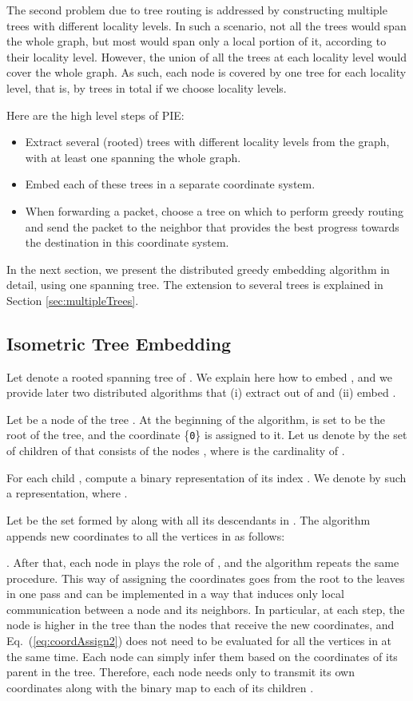 \documentclass[conference]{IEEEtran}
\begin{document}
The second problem due to tree routing is addressed by constructing multiple trees with different locality levels. In such a scenario, not all the trees would span the whole graph, but most would span only a local portion of it, according to their locality level. However, the union of all the trees at each locality level would cover the whole graph. As such, each node is covered by one tree for each locality level, that is, by  trees in total if we choose  locality levels.

Here are the high level steps of PIE:

\begin{itemize}
 \item Extract several (rooted) trees with different locality levels from the graph, with at least one spanning the whole graph.
 \item Embed each of these trees in a separate coordinate system.
 \item When forwarding a packet, choose a tree on which to perform greedy routing and send the packet to the neighbor that provides the best progress towards the destination in this coordinate system.
\end{itemize}

In the next section, we present the distributed greedy embedding algorithm in detail, using one spanning tree. The extension to several trees is explained in Section \ref{sec:multipleTrees}.

\subsection{Isometric Tree Embedding}
\label{sec:embedding}

Let  denote a rooted spanning tree of . We explain here how to embed , and we provide later two distributed algorithms that (i) extract  out of  and (ii) embed .


Let  be a node of the tree . At the beginning of the algorithm,  is set to be the root of the tree, and the coordinate \{\texttt{0}\} is assigned to it.
Let us denote by  the set of children of  that consists of the nodes , where  is the cardinality of .

For each child , compute a binary representation of its index . We denote by  such a representation, where .

Let  be the set formed by  along with all its descendants in . The algorithm appends  new coordinates  to all the vertices  in  as follows:

. After that, each node in  plays the role of , and the algorithm repeats the same procedure.
This way of assigning the coordinates goes from the root to the leaves in one pass and can be implemented in a way that induces only local communication between a node and its neighbors. In particular, at each step, the node  is higher in the tree than the nodes that receive the new coordinates, and Eq.\ (\ref{eq:coordAssign2}) does not need to be evaluated for all the vertices in  at the same time. Each node can simply infer them based on the coordinates of its parent in the tree. Therefore, each node  needs only to transmit its own coordinates along with the binary map  to each of its children .
\end{document}
